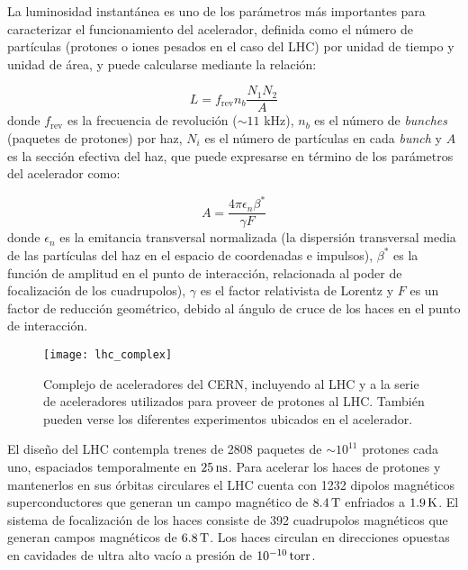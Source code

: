 La luminosidad instantánea es uno de los parámetros más importantes para
caracterizar el funcionamiento del acelerador, definida como el número de
partículas (protones o iones pesados en el caso del LHC) por unidad de tiempo y unidad de
área, y puede calcularse mediante la relación:

\begin{equation}
  L = f_\text{rev} n_b \frac{N_1 N_2}{A}
\end{equation}
%
donde $f_\text{rev}$ es la frecuencia de revolución ($\sim 11$ kHz), $n_b$ es el número de
\emph{bunches} (paquetes de protones) por haz, $N_i$ es el número de partículas
en cada \emph{bunch} y $A$ es la sección efectiva del haz, que puede expresarse en
término de los parámetros del acelerador como:

\begin{equation}
  A = \frac{4\pi \epsilon_n \beta^{*}}{\gamma F}
\end{equation}
%
donde $\epsilon_n$ es la emitancia transversal normalizada (la dispersión
transversal media de las partículas del haz en el espacio de coordenadas e
impulsos), $\beta^{*}$ es la función de amplitud en el punto de interacción,
relacionada al poder de focalización de los cuadrupolos), $\gamma$ es el
factor relativista de Lorentz y $F$ es un factor de reducción geométrico, debido
al ángulo de cruce de los haces en el punto de interacción.

\begin{figure}[!p]
  \centering

  \texttt{[image: lhc\_complex]}

  \caption{Complejo de aceleradores del CERN, incluyendo al LHC y a la serie
    de aceleradores utilizados para proveer de protones al LHC. También pueden verse
    los diferentes experimentos ubicados en el acelerador.}
  \label{fig:lhc_complex}

\end{figure}

El diseño del LHC contempla trenes de 2808 paquetes de $\sim 10^{11}$ protones cada uno,
espaciados temporalmente en $\unit[25]{ns}$.
Para acelerar los haces de protones y mantenerlos en sus órbitas circulares el
LHC cuenta con 1232 dipolos magnéticos superconductores que generan un campo
magnético de $\unit[8.4]{T}$ enfriados a $\unit[1.9]{K}$. El sistema de focalización de los haces
consiste de 392 cuadrupolos magnéticos que generan campos magnéticos de $\unit[6.8]{T}$.
Los haces circulan en direcciones opuestas en cavidades de ultra alto vacío
a presión de $\unit[10^{-10}]{torr}$.


